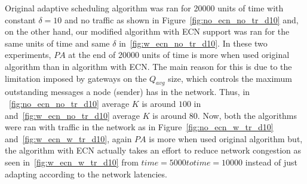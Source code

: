 Original adaptive scheduling algorithm was ran for 20000 units of time with
constant $\delta=10$ and no traffic as shown in Figure~\ref{fig:no_ecn_no_tr_d10} and, 
on the other hand, our modified algorithm with ECN support was ran for the same units of 
time and same $\delta$ in~\ref{fig:w_ecn_no_tr_d10}. In these two experiments, $PA$ at the 
end of 20000 units of time is more when used original algorithm than in algorithm with ECN. 
The main reason for this is due to the limitation imposed by gateways on the $Q_{avg}$ size, 
which controls the maximum outstanding messages a node (sender) has in the network. Thus, in
~\ref{fig:no_ecn_no_tr_d10} average $K$ is around $100$ in and~\ref{fig:w_ecn_no_tr_d10} 
average $K$ is around $80$. Now, both the algorithms were ran with traffic in the network as 
in Figure~\ref{fig:no_ecn_w_tr_d10} and~\ref{fig:w_ecn_w_tr_d10}, again $PA$ is more when used 
original algorithm but, the algorithm with ECN actually takes an effort to reduce network congestion
as seen in~\ref{fig:w_ecn_w_tr_d10} from $time=5000 to time=10000$ instead of just adapting 
according to the network latencies.  








